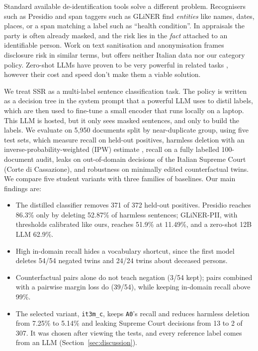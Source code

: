 \documentclass[11pt]{article}
\begin{document}
Standard available de-identification tools solve a different problem. Recognisers such as Presidio \citep{presidio} and span taggers such as GLiNER \citep{zaratiana2024gliner} find \emph{entities} like names, dates, places, or a span matching a label such as ``health condition''. In appraisals the party is often already masked, and the risk lies in the \emph{fact} attached to an identifiable person. Work on text sanitisation \citep{sanchez2016csanitized} and anonymisation \citep{lison2021anonymisation,pilan2022tab} frames disclosure risk in similar terms, but offers neither Italian data nor our category policy. Zero-shot LLMs have proven to be very powerful in related tasks \citep{gilardi2023chatgpt}, however their cost and speed don't make them a viable solution.

We treat SSR as a multi-label sentence classification task. The policy is written as a decision tree in the system prompt that a powerful LLM uses to distil labels, which are then used to fine-tune a small encoder that runs locally on a laptop. This LLM is hosted, but it only sees masked sentences, and only to build the labels. We evaluate on 5,950 documents split by near-duplicate group, using five test sets, which measure recall on held-out positives, harmless deletion with an inverse-probability-weighted (IPW) estimate \citep{horvitz1952generalization}, recall on a fully labelled 100-document audit, leaks on out-of-domain decisions of the Italian Supreme Court (Corte di Cassazione), and robustness on minimally edited counterfactual twins. We compare five student variants with three families of baselines. Our main findings are:
\begin{itemize}\itemsep0pt
\item The distilled classifier removes 371 of 372 held-out positives. Presidio reaches 86.3\% only by deleting 52.87\% of harmless sentences; GLiNER-PII, with thresholds calibrated like ours, reaches 51.9\% at 11.49\%, and a zero-shot 12B LLM 62.9\%.
\item High in-domain recall hides a vocabulary shortcut, since the first model deletes 54/54 negated twins and 24/24 twins about deceased persons.
\item Counterfactual pairs alone do not teach negation (3/54 kept); pairs combined with a pairwise margin loss do (39/54), while keeping in-domain recall above 99\%.
\item The selected variant, \texttt{it3m\_c}, keeps \texttt{A0}'s recall and reduces harmless deletion from 7.25\% to 5.14\% and leaking Supreme Court decisions from 13 to 2 of 307. It was chosen after viewing the tests, and every reference label comes from an LLM (Section~\ref{sec:discussion}).
\end{itemize}
\end{document}
